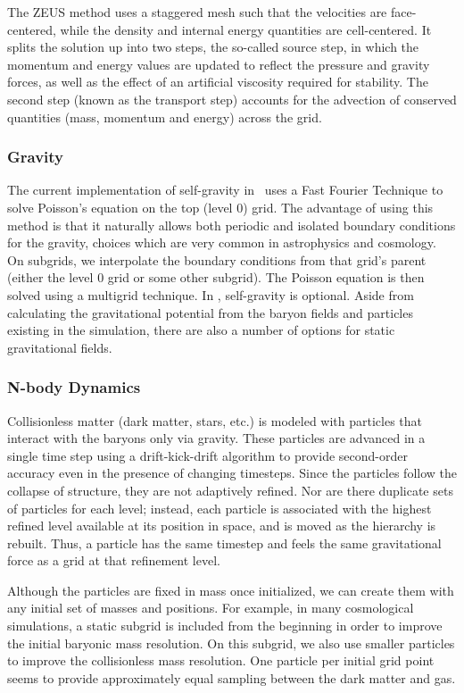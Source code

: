 The ZEUS method uses a staggered mesh such that the velocities are
face-centered, while the density and internal energy quantities are
cell-centered.  It splits the solution up into two steps, the
so-called source step, in which the momentum and energy values are
updated to reflect the pressure and gravity forces, as well as the
effect of an artificial viscosity required for stability.  The second
step (known as the transport step) accounts for the advection of
conserved quantities (mass, momentum and energy) across the grid.

\subsubsection{Gravity}

The current implementation of self-gravity in \enzo\ uses a Fast
Fourier Technique \citep{Hockney88} to solve Poisson's equation on the
top (level 0) grid.  The advantage of using this method is that it
naturally allows both periodic and isolated boundary conditions for
the gravity, choices which are very common in astrophysics and
cosmology.  On subgrids, we interpolate the boundary conditions from
that grid's parent (either the level 0 grid or some other subgrid).
The Poisson equation is then solved using a multigrid technique.  In
\enzo, self-gravity is optional.  Aside from calculating the
gravitational potential from the baryon fields and particles existing
in the simulation, there are also a number of options for static gravitational fields.

\subsubsection{N-body Dynamics}

Collisionless matter (dark matter, stars, etc.) is modeled with
particles that interact with the baryons only via gravity.  These
particles are advanced in a single time step using a drift-kick-drift
algorithm to provide second-order accuracy even in the presence of
changing timesteps.  Since the particles follow the collapse of
structure, they are not adaptively refined.  Nor are there duplicate
sets of particles for each level; instead, each particle is associated
with the highest refined level available at its position in space, and is
moved as the hierarchy is rebuilt.  Thus, a particle has the same
timestep and feels the same gravitational force as a grid at that refinement
level.

Although the particles are fixed in mass once initialized, we can
create them with any initial set of masses and positions.  For example, in
many cosmological simulations, a static subgrid is included from the
beginning in order to improve the initial baryonic mass resolution.
On this subgrid, we also use smaller particles to improve the
collisionless mass resolution.  One particle per initial grid point
seems to provide approximately equal sampling between the dark matter
and gas.

